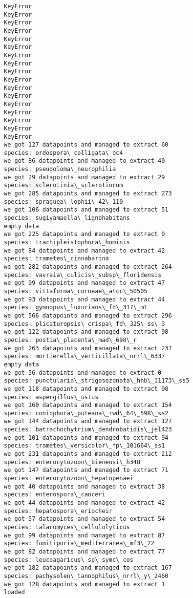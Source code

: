 \documentclass[11pt]{article}
\begin{document}
\begin{Verbatim}[commandchars=\\\{\}]
KeyError
KeyError
KeyError
KeyError
KeyError
KeyError
KeyError
KeyError
KeyError
KeyError
KeyError
KeyError
KeyError
KeyError
KeyError
KeyError
KeyError
we got 127 datapoints and managed to extract 60
species: ordospora\_colligata\_oc4
we got 86 datapoints and managed to extract 40
species: pseudoloma\_neurophilia
we got 29 datapoints and managed to extract 29
species: sclerotinia\_sclerotiorum
we got 285 datapoints and managed to extract 273
species: spraguea\_lophii\_42\_110
we got 106 datapoints and managed to extract 51
species: sugiyamaella\_lignohabitans
empty data
we got 225 datapoints and managed to extract 0
species: trachipleistophora\_hominis
we got 84 datapoints and managed to extract 42
species: trametes\_cinnabarina
we got 282 datapoints and managed to extract 264
species: vavraia\_culicis\_subsp\_floridensis
we got 99 datapoints and managed to extract 47
species: vittaforma\_corneae\_atcc\_50505
we got 93 datapoints and managed to extract 44
species: gymnopus\_luxurians\_fd\_317\_m1
we got 566 datapoints and managed to extract 296
species: plicaturopsis\_crispa\_fd\_325\_ss\_3
we got 122 datapoints and managed to extract 98
species: postia\_placenta\_mad\_698\_r
we got 263 datapoints and managed to extract 237
species: mortierella\_verticillata\_nrrl\_6337
empty data
we got 56 datapoints and managed to extract 0
species: punctularia\_strigosozonata\_hhb\_11173\_ss5
we got 118 datapoints and managed to extract 98
species: aspergillus\_ustus
we got 160 datapoints and managed to extract 154
species: coniophora\_puteana\_rwd\_64\_598\_ss2
we got 144 datapoints and managed to extract 127
species: batrachochytrium\_dendrobatidis\_jel423
we got 101 datapoints and managed to extract 94
species: trametes\_versicolor\_fp\_101664\_ss1
we got 231 datapoints and managed to extract 212
species: enterocytozoon\_bieneusi\_h348
we got 147 datapoints and managed to extract 71
species: enterocytozoon\_hepatopenaei
we got 40 datapoints and managed to extract 38
species: enterospora\_canceri
we got 44 datapoints and managed to extract 42
species: hepatospora\_eriocheir
we got 57 datapoints and managed to extract 54
species: talaromyces\_cellulolyticus
we got 99 datapoints and managed to extract 87
species: fomitiporia\_mediterranea\_mf3\_22
we got 82 datapoints and managed to extract 77
species: leucoagaricus\_sp\_symc\_cos
we got 182 datapoints and managed to extract 167
species: pachysolen\_tannophilus\_nrrl\_y\_2460
we got 128 datapoints and managed to extract 1
loaded

    \end{Verbatim}
\end{document}

